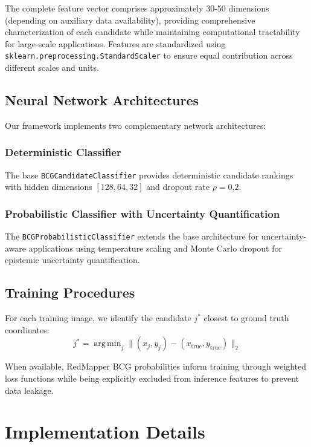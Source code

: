 \documentclass[twocolumn,10pt]{aastex631}
\DeclareMathOperator*{\argmin}{arg\,min}
\begin{document}
The complete feature vector comprises approximately 30-50 dimensions (depending on auxiliary data availability), providing comprehensive characterization of each candidate while maintaining computational tractability for large-scale applications. Features are standardized using \texttt{sklearn.preprocessing.StandardScaler} to ensure equal contribution across different scales and units.

\subsection{Neural Network Architectures}

Our framework implements two complementary network architectures:

\subsubsection{Deterministic Classifier}
The base \texttt{BCGCandidateClassifier} provides deterministic candidate rankings with hidden dimensions $[128, 64, 32]$ and dropout rate $\rho = 0.2$.

\subsubsection{Probabilistic Classifier with Uncertainty Quantification}
The \texttt{BCGProbabilisticClassifier} extends the base architecture for uncertainty-aware applications using temperature scaling and Monte Carlo dropout for epistemic uncertainty quantification.

\subsection{Training Procedures}

For each training image, we identify the candidate $j^*$ closest to ground truth coordinates:
\begin{equation}
j^* = \argmin_j \|(x_j, y_j) - (x_{\text{true}}, y_{\text{true}})\|_2
\end{equation}

When available, RedMapper BCG probabilities inform training through weighted loss functions while being explicitly excluded from inference features to prevent data leakage.

\section{Implementation Details}
\end{document}

